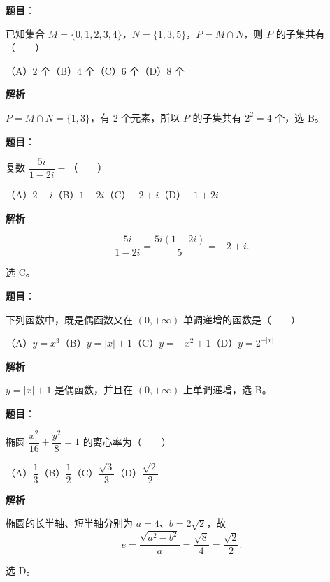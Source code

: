 

\begin{answer}

\textbf{题目}：

已知集合 $M=\{0,1,2,3,4\}$，$N=\{1,3,5\}$，$P=M\cap N$，则 $P$ 的子集共有\mbox{（　　）}

（A）$2$ 个\quad（B）$4$ 个\quad（C）$6$ 个\quad（D）$8$ 个

\textbf{解析}

$P=M\cap N=\{1,3\}$，有 $2$ 个元素，所以 $P$ 的子集共有
$2^2=4$ 个，选 B。


\end{answer}
\begin{answer}

\textbf{题目}：

复数 $\dfrac{5i}{1-2i}=$\mbox{（　　）}

（A）$2-i$\quad（B）$1-2i$\quad（C）$-2+i$\quad（D）$-1+2i$

\textbf{解析}

\nopagebreak[4]
\[
\frac{5i}{1-2i}
=\frac{5i(1+2i)}5=-2+i.
\]

选 C。


\end{answer}
\begin{answer}

\textbf{题目}：

下列函数中，既是偶函数又在 $(0,+\infty)$ 单调递增的函数是\mbox{（　　）}

（A）$y=x^3$\quad（B）$y=|x|+1$\quad（C）$y=-x^2+1$\quad（D）$y=2^{-|x|}$

\textbf{解析}

$y=|x|+1$ 是偶函数，并且在 $(0,+\infty)$ 上单调递增，选 B。


\end{answer}
\begin{answer}

\textbf{题目}：

椭圆 $\dfrac{x^2}{16}+\dfrac{y^2}{8}=1$ 的离心率为\mbox{（　　）}

（A）$\dfrac13$\quad（B）$\dfrac12$\quad（C）$\dfrac{\sqrt3}{3}$\quad（D）$\dfrac{\sqrt2}{2}$

\textbf{解析}

椭圆的长半轴、短半轴分别为 $a=4$、$b=2\sqrt2$，故
\nopagebreak[4]
\[
e=\frac{\sqrt{a^2-b^2}}a
=\frac{\sqrt8}{4}=\frac{\sqrt2}{2}.
\]

选 D。


\end{answer}
